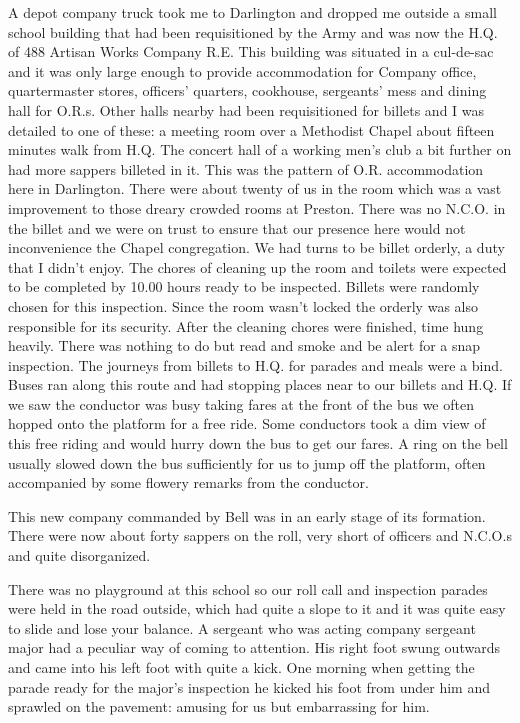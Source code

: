 A depot company truck took me to Darlington and dropped me outside a
small school building that had been requisitioned by the Army and was
now the H.Q. of 488 Artisan Works Company R.E. This building was
situated in a cul-de-sac and it was only large enough to provide
accommodation for Company office, quartermaster stores, officers' quarters,
cookhouse, sergeants' mess and dining hall for O.R.s. Other halls
nearby had been requisitioned for billets and I was detailed to one of
these: a meeting room over a Methodist Chapel about fifteen minutes
walk from H.Q. The concert hall of a working men's club a bit further
on had more sappers billeted in it. This was the pattern of
O.R. accommodation here in Darlington. There were about twenty of us
in the room which was a vast improvement to those dreary crowded rooms
at Preston. There was no N.C.O. in the billet and we were on trust to
ensure that our presence here would not inconvenience the Chapel
congregation. We had turns to be billet orderly, a duty that I didn't
enjoy. The chores of cleaning up the room and toilets were expected
to be completed by 10.00 hours ready to be inspected. Billets were
randomly chosen for this inspection. Since the room wasn't locked
the orderly was also responsible for its security. After the cleaning
chores were finished, time hung heavily. There was nothing to do but
read and smoke and be alert for a snap inspection. The journeys
from billets to H.Q. for parades and meals were a bind. Buses ran
along this route and had stopping places near to our billets and H.Q.
If we saw the conductor was busy taking fares at the front of the bus
we often hopped onto the platform for a free ride. Some conductors
took a dim view of this free riding and would hurry down the bus to
get our fares. A ring on the bell usually slowed down the bus
sufficiently for us to jump off the platform, often accompanied by
some flowery remarks from the conductor. 

This new company commanded by \major Bell was in an early stage of its
formation. There were now about forty sappers on the roll, very short
of officers and N.C.O.s and quite disorganized. 

There was no playground at this school so our roll call and inspection
parades were held in the road outside, which had quite a slope to it
and it was quite easy to slide and lose your balance. A sergeant who
was acting company sergeant major had a peculiar way of coming to
attention. His right foot swung outwards and came into his left foot
with quite a kick. One morning when getting the parade ready for the
major's inspection he kicked his foot from under him and sprawled on
the pavement: amusing for us but embarrassing for him.

